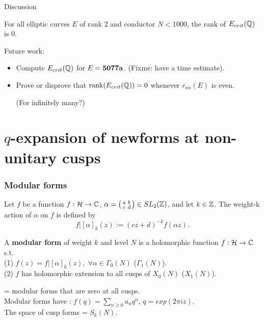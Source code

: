 \documentclass[handout]{beamer}
\begin{document}
\begin{frame}{Discussion}

\begin{Corollary}
For all elliptic curves $E$ of rank 2 and conductor $N <1000$, the rank of $E_{crit}(\mathbb{Q})$ is 0.
\end{Corollary}
\pause
\smallskip
Future work: 
\begin{itemize}
\item Compute $E_{crit}(\mathbb{Q})$ for $E = {\bf 5077a}$. (Fixme: have a time estimate). 

\item Prove or disprove that $\rank(E_{crit}(\mathbb{Q})) = 0$ whenever $r_{an}(E)$ is even.

(For infinitely many?) 

\end{itemize}

\end{frame}







\section{$q$-expansion of newforms at non-unitary cusps} 

 \begin{frame}
 \frametitle{\insertsection}
 \tableofcontents[currentsection]
 \end{frame}





\begin{frame}
\frametitle{Modular forms}
Let $f$ be a function $f: \mathcal{H} \to \mathbb{C}$,  $\alpha  = \left( \begin{smallmatrix}a&b\\c&d\end{smallmatrix}\right) \in SL_2(\mathbb{Z})$, and let $k \in \mathbb{Z}$. The weight-k action of $\alpha$ on $f$ is
defined by
\[
	f|[\alpha]_k(z) := (cz+d)^{-k}f(\alpha z).
\]

\pause

\begin{Def}
A \textbf{modular form} of weight $k$ and level $N$ is a holomorphic function $f: \mathcal{H} \to \mathbb{C}$ s.t. \\
(1) $f(z)  = f|[\alpha]_k(z), \; \forall \alpha \in \Gamma_0(N)$ ($\Gamma_1(N)$). \\
(2) $f$ has holomorphic extension to all cusps of $X_0(N)$ ($X_1(N)$). \\
\end{Def}

\pause

 = modular forms that are zero at all cusps. \\
Modular forms have : $f(q) = \sum_{n \geq 0} a_n q^n$, $q = exp(2\pi i z)$. \\
The space of cusp forms = $S_k(N)$. 

\end{frame}
\end{document}

